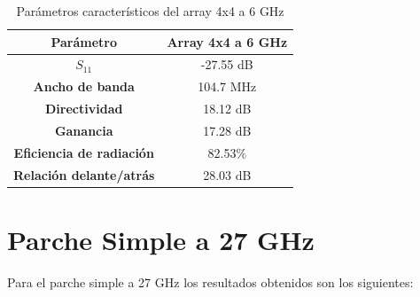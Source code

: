 \begin{table}[H]
  
   
   \small %
   \centering %
   \begin{tabular}{c c} %
   \toprule[\heavyrulewidth]\toprule[\heavyrulewidth]
   \textbf{Parámetro} & \textbf{Array 4x4 a 6 GHz} \\ 
   \midrule
   \textbf{$S_{11}$} & -27.55 dB \\
   \textbf{Ancho de banda} & 104.7 MHz \\
   \textbf{Directividad} & 18.12 dB \\
   \textbf{Ganancia} & 17.28 dB \\
   \textbf{Eficiencia de radiación} & 82.53\% \\
   \textbf{Relación delante/atrás} & 28.03 dB \\

   \bottomrule[\heavyrulewidth] 
   \end{tabular}
   
   \caption{Parámetros característicos del array 4x4 a 6 GHz} 
   \label{tab:res4x42}
\end{table}



























\section{Parche Simple a 27 GHz}
\par Para el parche simple a 27 GHz los resultados obtenidos son los siguientes:

